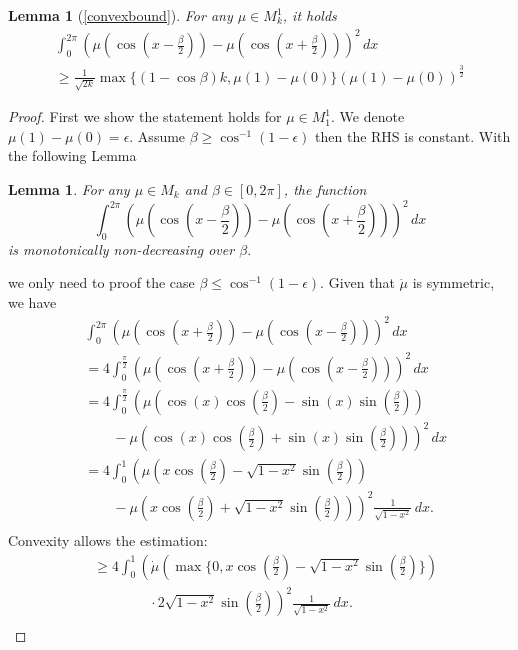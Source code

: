 \documentclass[twoside]{article} \usepackage{aistats2017}
\newtheorem{lemma}[theorem]{Lemma}
\newtheorem*{lemma*}{Lemma}
\begin{document}
    \begin{lemma*}[\ref{convexbound}]
        For any $\mu\in M_k^1$, it holds
        \begin{align*}
            \int_{0}^{2\pi}\left(\mu(\cos(x-\frac{\beta}{2}))-\mu( \cos(x+\frac{\beta}{2}))\right)^2\, dx\\
            \geq \frac{1}{\sqrt{2k}}\max\{(1-\cos{\beta})k,\mu(1)-\mu(0)\}(\mu(1)-\mu(0))^\frac{3}{2}
        \end{align*}
    \end{lemma*}
    \begin{proof}
    First we show the statement holds for $\mu\in M_1^1$. We denote $\mu(1)-\mu(0)=\epsilon$. Assume $\beta\geq\cos^{-1}(1-\epsilon)$ then the RHS is constant. With the following Lemma
    \begin{lemma}
        For any $\mu\in M_k$ and $\beta \in[0,2\pi]$, the function
        $$\int_{0}^{2\pi}\left(\mu(\cos(x-\frac{\beta}{2}))-\mu( \cos(x+\frac{\beta}{2}))\right)^2\, dx$$
        is monotonically non-decreasing over $\beta$.
    \end{lemma}
    we only need to proof the case $\beta\leq\cos^{-1}(1-\epsilon)$.
    Given that $\dot{\mu}$ is symmetric, we have
    \begin{align*}
        &\int_{0}^{2\pi}\left(\mu(\cos(x+\frac{\beta}{2}))-\mu( \cos(x-\frac{\beta}{2}))\right)^2\, dx\\
        &=4\int_{0}^{\frac{\pi}{2}}\left(\mu(\cos(x+\frac{\beta}{2}))-\mu( \cos(x-\frac{\beta}{2}))\right)^2\, dx\\
        &=4\int_{0}^{\frac{\pi}{2}}\left(\mu(\cos(x)\cos(\frac{\beta}{2})-\sin(x)\sin(\frac{\beta}{2}) )\right.\\
        &\left.\qquad-\mu(\cos(x)\cos(\frac{\beta}{2})+\sin(x)\sin(\frac{\beta}{2}) )\right)^2\, dx\\
        &=4\int_{0}^{1}\left(\mu(x\cos(\frac{\beta}{2})-\sqrt{1-x^2}\sin(\frac{\beta}{2}) )\right.\\
        &\left.\qquad-\mu(x\cos(\frac{\beta}{2})+\sqrt{1-x^2}\sin(\frac{\beta}{2}) )\right)^2\frac{1}{\sqrt{1-x^2}}\, dx.\\
        \end{align*}
    Convexity allows the estimation:
    \begin{align*}
        &\geq4\int_{0}^{1}\left(\dot{\mu}(\max\{0,x\cos(\frac{\beta}{2})-\sqrt{1-x^2}\sin(\frac{\beta}{2})\} )\right.\\
        &\left.\qquad\qquad\cdot 2 \sqrt{1-x^2}\sin(\frac{\beta}{2})\right)^2\frac{1}{\sqrt{1-x^2}}\, dx.\\

\end{align*}
\end{proof}
\end{document}
